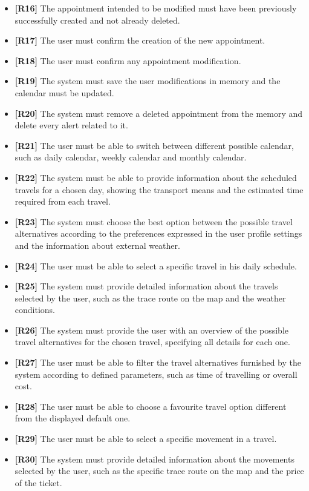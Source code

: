\begin{itemize}
	\item \textbf{[R16]} The appointment intended to be modified must have been previously successfully created and not already deleted.
	\item \textbf{[R17]} The user must confirm the creation of the new appointment.
	\item \textbf{[R18]} The user must confirm any appointment modification.
	\item \textbf{[R19]} The system must save the user modifications in memory and the calendar must be updated.
	\item \textbf{[R20]} The system must remove a deleted appointment from the memory and delete every alert related to it.
	\item \textbf{[R21]} The user must be able to switch between different possible calendar, such as daily calendar, weekly calendar and monthly calendar.
	\item \textbf{[R22]} The system must be able to provide information about the scheduled travels for a chosen day, showing the transport means and the estimated time required from each travel.
	\item \textbf{[R23]} The system must choose the best option between the possible travel alternatives according to the preferences expressed in the user profile settings and the information about external weather.
	\item \textbf{[R24]} The user must be able to select a specific travel in his daily schedule.
	\item \textbf{[R25]} The system must provide detailed information about the travels selected by the user, such as the trace route on the map and the weather conditions.
	\item \textbf{[R26]} The system must provide the user with an overview of the possible travel alternatives for the chosen travel, specifying all details for each one.
	\item \textbf{[R27]} The user must be able to filter the travel alternatives furnished by the system according to defined parameters, such as time of travelling or overall cost.
	\item \textbf{[R28]} The user must be able to choose a favourite travel option different from the displayed default one.
	\item \textbf{[R29]} The user must be able to select a specific movement in a travel.
	\item \textbf{[R30]} The system must provide detailed information about the movements selected by the user, such as the specific trace route on the map and the price of the ticket.

\end{itemize}
